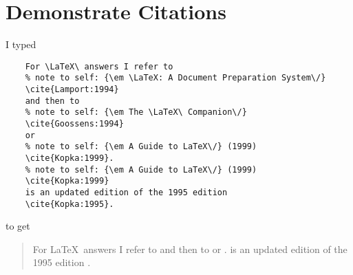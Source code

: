 %
%


\chapter{Demonstrate Citations}

I typed

\begin{verbatim}
    For \LaTeX\ answers I refer to
    % note to self: {\em \LaTeX: A Document Preparation System\/}
    \cite{Lamport:1994}
    and then to
    % note to self: {\em The \LaTeX\ Companion\/}
    \cite{Goossens:1994}
    or
    % note to self: {\em A Guide to LaTeX\/} (1999)
    \cite{Kopka:1999}.
    % note to self: {\em A Guide to LaTeX\/} (1999)
    \cite{Kopka:1999}
    is an updated edition of the 1995 edition
    \cite{Kopka:1995}.
\end{verbatim}

to get

\begin{quotation}
    For \LaTeX\ answers I refer to
    \cite{Lamport:1994}
    and then to
    \cite{Goossens:1994}
    or
    \cite{Kopka:1999}.
    \cite{Kopka:1999}
    is an updated edition of the 1995 edition
    \cite{Kopka:1995}.
\end{quotation}